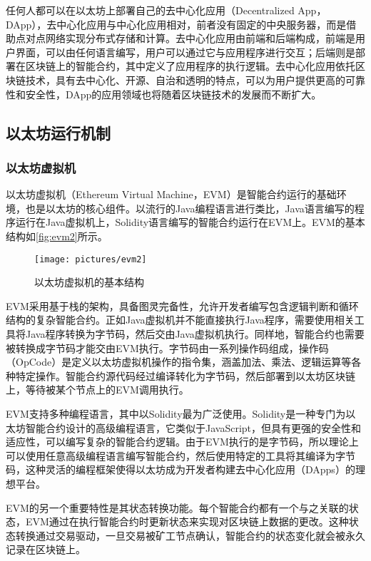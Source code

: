     任何人都可以在以太坊上部署自己的去中心化应用（Decentralized App，DApp），去中心化应用与中心化应用相对，前者没有固定的中央服务器，而是借助点对点网络实现分布式存储和计算。去中心化应用由前端和后端构成，前端是用户界面，可以由任何语言编写，用户可以通过它与应用程序进行交互；后端则是部署在区块链上的智能合约，其中定义了应用程序的执行逻辑。去中心化应用依托区块链技术，具有去中心化、开源、自治和透明的特点，可以为用户提供更高的可靠性和安全性，DApp的应用领域也将随着区块链技术的发展而不断扩大。


\subsection{以太坊运行机制}
\label{sec:以太坊运行机制}

\subsubsection{以太坊虚拟机}
    
    以太坊虚拟机（Ethereum Virtual Machine，EVM）是智能合约运行的基础环境，也是以太坊的核心组件。以流行的Java编程语言进行类比，Java语言编写的程序运行在Java虚拟机上，Solidity语言编写的智能合约运行在EVM上。EVM的基本结构如\autoref{fig:evm2}所示。
        \begin{figure}[htbp]
            \centering
            \texttt{[image: pictures/evm2]}
            \caption{\label{fig:evm2}以太坊虚拟机的基本结构}
        \end{figure}

    EVM采用基于栈的架构，具备图灵完备性，允许开发者编写包含逻辑判断和循环结构的复杂智能合约。正如Java虚拟机并不能直接执行Java程序，需要使用相关工具将Java程序转换为字节码，然后交由Java虚拟机执行。同样地，智能合约也需要被转换成字节码才能交由EVM执行。字节码由一系列操作码组成，操作码（OpCode）是定义以太坊虚拟机操作的指令集，涵盖加法、乘法、逻辑运算等各种特定操作。智能合约源代码经过编译转化为字节码，然后部署到以太坊区块链上，等待被某个节点上的EVM调用执行。

    EVM支持多种编程语言，其中以Solidity最为广泛使用。Solidity是一种专门为以太坊智能合约设计的高级编程语言，它类似于JavaScript，但具有更强的安全性和适应性，可以编写复杂的智能合约逻辑。由于EVM执行的是字节码，所以理论上可以使用任意高级编程语言编写智能合约，然后使用特定的工具将其编译为字节码，这种灵活的编程框架使得以太坊成为开发者构建去中心化应用（DApps）的理想平台。

    EVM的另一个重要特性是其状态转换功能。每个智能合约都有一个与之关联的状态，EVM通过在执行智能合约时更新状态来实现对区块链上数据的更改。这种状态转换通过交易驱动，一旦交易被矿工节点确认，智能合约的状态变化就会被永久记录在区块链上。

